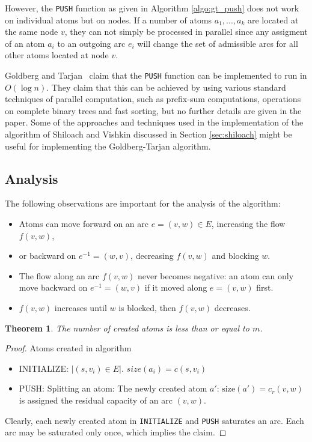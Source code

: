 \documentclass[a4paper,10pt, twocolumn]{article}
\newtheorem{theorem}[lemma]{Theorem}
\begin{document}
However, the \lstinline|PUSH| function as given in Algorithm \ref{algo:gt_push} does not work on individual atoms but on nodes. If a number of atoms $a_1,...,a_k$ are located at the same node $v$, they can not simply be processed in parallel since any assigment of an atom $a_i$ to an outgoing arc $e_i$ will change the set of admissible arcs for all other atoms located at node $v$.

Goldberg and Tarjan~\cite{goldberg89} claim that the \lstinline|PUSH| function can be implemented to run in $O(\log n)$. They claim that this can be achieved by using various standard techniques of parallel computation, such as prefix-sum computations, operations on complete binary trees and fast sorting, but no further details are given in the paper. Some of the approaches and techniques used in the implementation of the algorithm of Shiloach and Vishkin discussed in Section \ref{sec:shiloach} might be useful for implementing the Goldberg-Tarjan algorithm.


\subsection{Analysis}
\label{sec:gt_analysis}
The following observations are important for the analysis of the algorithm:
\begin{itemize}
	\item Atoms can move forward on an arc $e=(v,w) \in E$, increasing the flow $f(v,w)$,
	\item or backward on $e^{-1}=(w,v)$, decreasing $f(v,w)$ and blocking $w$. 
	\item The flow along an arc $f(v,w)$ never becomes negative: an atom can only move backward on $e^{-1}=(w,v)$ if it moved along $e=(v,w)$ first.
	\item $f(v,w)$ increases until $w$ is blocked, then $f(v,w)$ decreases.
\end{itemize}

\begin{theorem}
The number of created atoms is less than or equal to $m$.
\end{theorem}
\begin{proof}
Atoms created in algorithm
\begin{itemize}
	\item INITIALIZE: $\lvert (s,v_i) \in E \rvert$. $size(a_i) = c(s,v_i)$
	\item PUSH: Splitting an atom: The newly created atom $a'$: $\mathrm{size}(a') = c_r(v,w)$ is assigned the residual capacity of an arc $(v,w)$.
\end{itemize}
Clearly, each newly created atom in \lstinline|INITIALIZE| and \lstinline|PUSH| saturates an arc. Each arc may be saturated only once, which implies the claim.
\end{proof}
\end{document}
